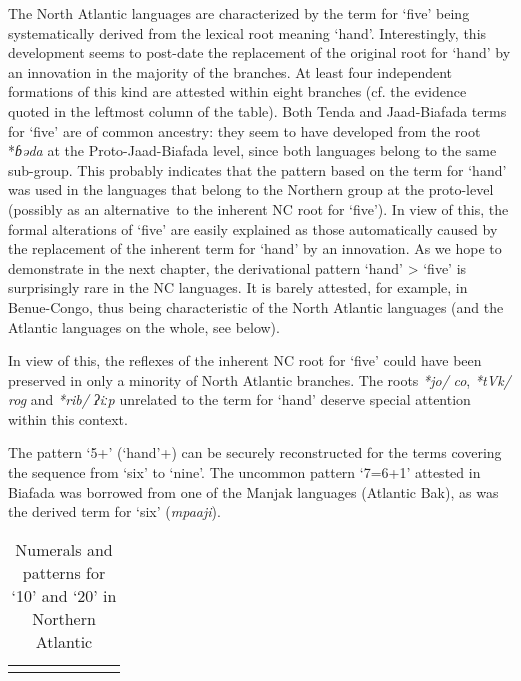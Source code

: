 {The North Atlantic languages are characterized by the term for ‘five’ being systematically derived from the lexical root meaning ‘hand’. Interestingly, this development seems to post-date the replacement of the original root for ‘hand’ by an innovation in the majority of the branches. At least four independent formations of this kind are attested within eight branches (cf. the evidence quoted in the leftmost column of the table). Both Tenda and Jaad-Biafada terms for ‘five’ are of common ancestry: they seem to have developed from the root *\textit{ɓəda} at the Proto-Jaad-Biafada level, since both languages belong to the same sub-group. This probably indicates that the pattern based on the term for ‘hand’ was used in the languages that belong to the Northern group at the proto-level (possibly as an alternative~to the inherent NC root for ‘five’). In view of this, the formal alterations of ‘five’ are easily explained as those automatically caused by the replacement of the inherent term for ‘hand’ by an innovation. As we hope to demonstrate in the next chapter, the derivational pattern ‘hand’ > ‘five’ is surprisingly rare in the NC languages. It is barely attested, for example, in Benue-Congo, thus being characteristic of the North Atlantic languages (and the Atlantic languages on the whole, see below). 

In view of this, the reflexes of the inherent NC root for ‘five’ could have been preserved in only a minority of North Atlantic branches. The roots \textit{*jo/} \textit{co}, \textit{*tVk/} \textit{rog} and \textit{*rib/} \textit{ʔiːp} unrelated to the term for ‘hand’ deserve special attention within this context.

The pattern ‘5+’ (‘hand’+) can be securely reconstructed for the terms covering the sequence from ‘six’ to ‘nine’. The uncommon pattern ‘7=6+1’ attested in Biafada was borrowed from one of the Manjak languages (Atlantic Bak), as was the derived term for ‘six’ (\textit{mpaaji}).


\begin{table}
\caption{\label{tab:3:232}Numerals and patterns for `10' and `20' in Northern Atlantic}


\begin{tabularx}{\textwidth}{l llQllX}
\lsptoprule


\end{tabularx}
\end{table}}
